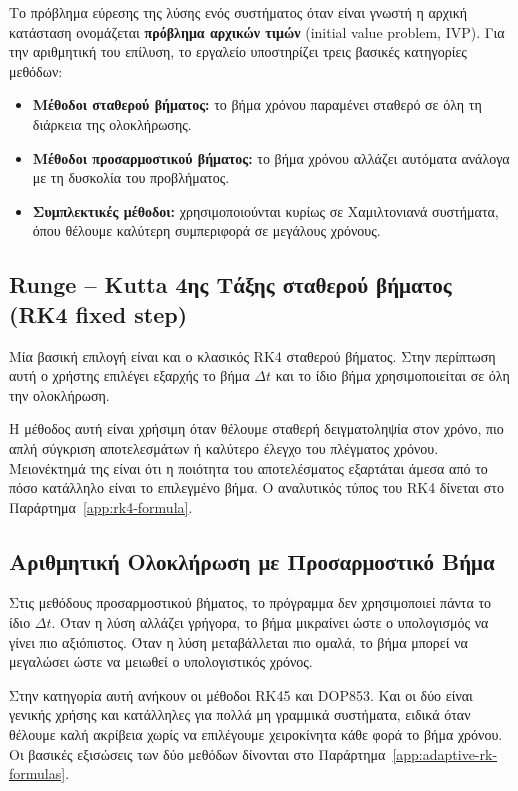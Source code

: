 \documentclass[11pt,a4paper]{report}
\begin{document}
Το πρόβλημα εύρεσης της λύσης ενός συστήματος όταν είναι γνωστή η αρχική
κατάσταση ονομάζεται \textbf{πρόβλημα αρχικών τιμών}
(\foreignlanguage{english}{initial value problem}, IVP). Για την αριθμητική
του επίλυση, το εργαλείο υποστηρίζει τρεις βασικές κατηγορίες μεθόδων:

\begin{itemize}
\item \textbf{Μέθοδοι σταθερού βήματος:} το βήμα χρόνου παραμένει σταθερό σε
όλη τη διάρκεια της ολοκλήρωσης.
\item \textbf{Μέθοδοι προσαρμοστικού βήματος:} το βήμα χρόνου αλλάζει
αυτόματα ανάλογα με τη δυσκολία του προβλήματος.
\item \textbf{Συμπλεκτικές μέθοδοι:} χρησιμοποιούνται κυρίως σε
Χαμιλτονιανά συστήματα, όπου θέλουμε καλύτερη συμπεριφορά σε μεγάλους χρόνους.
\end{itemize}

\subsection{Runge – Kutta 4ης Τάξης σταθερού βήματος (RK4 fixed step)}
\label{subsec:rk4-fixed-step}

Μία βασική επιλογή είναι και ο κλασικός RK4 σταθερού βήματος. Στην περίπτωση
αυτή ο χρήστης επιλέγει εξαρχής το βήμα
$\Delta t$ και το ίδιο βήμα χρησιμοποιείται σε όλη την ολοκλήρωση.

Η μέθοδος αυτή είναι χρήσιμη όταν θέλουμε σταθερή δειγματοληψία στον χρόνο,
πιο απλή σύγκριση αποτελεσμάτων ή καλύτερο έλεγχο του πλέγματος χρόνου.
Μειονέκτημά της είναι ότι η ποιότητα του αποτελέσματος εξαρτάται άμεσα από το
πόσο κατάλληλο είναι το επιλεγμένο βήμα. Ο αναλυτικός τύπος του RK4 δίνεται στο
Παράρτημα~\ref{app:rk4-formula}.

\subsection{Αριθμητική Ολοκλήρωση με Προσαρμοστικό Βήμα}
\label{subsec:adaptive-step-integration}

Στις μεθόδους προσαρμοστικού βήματος, το πρόγραμμα δεν χρησιμοποιεί πάντα το
ίδιο $\Delta t$. Όταν η λύση αλλάζει γρήγορα, το βήμα μικραίνει ώστε ο
υπολογισμός να γίνει πιο αξιόπιστος. Όταν η λύση μεταβάλλεται πιο ομαλά, το
βήμα μπορεί να μεγαλώσει ώστε να μειωθεί ο υπολογιστικός χρόνος.

Στην κατηγορία αυτή ανήκουν οι μέθοδοι RK45 και DOP853. Και οι δύο είναι
γενικής χρήσης και κατάλληλες για πολλά μη γραμμικά συστήματα, ειδικά όταν
θέλουμε καλή ακρίβεια χωρίς να επιλέγουμε χειροκίνητα κάθε φορά το βήμα
χρόνου. Οι βασικές εξισώσεις των δύο μεθόδων δίνονται στο
Παράρτημα~\ref{app:adaptive-rk-formulas}.
\end{document}

